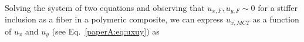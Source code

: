 %

Solving the system of two equations and observing that $u_{x,F},u_{y,F}\sim0$ for a stiffer inclusion as a fiber in a polymeric composite, we can express $u_{x,MCT}$ as a function of $u_{x}$ and $u_{y}$ (see Eq.~\ref{paperA:eq:uxuy}) as

